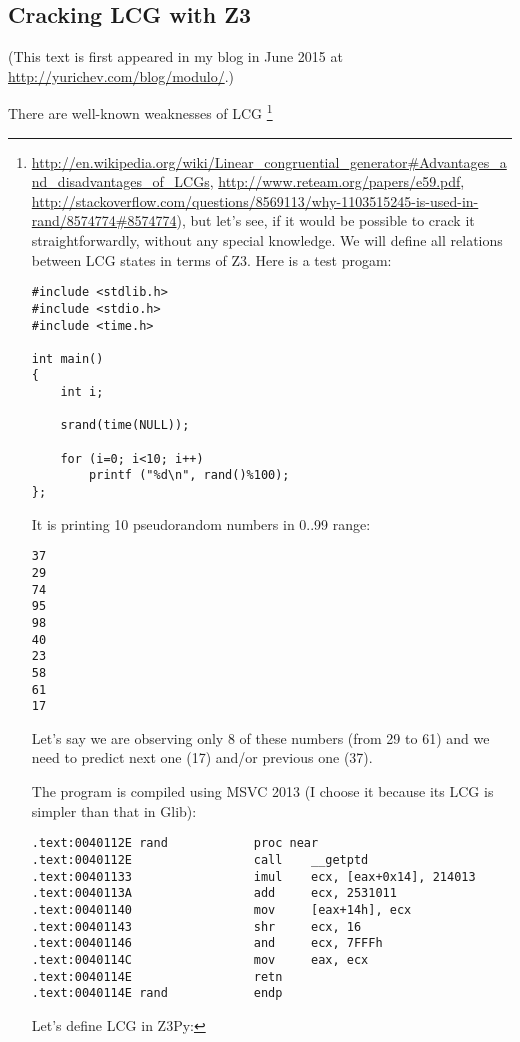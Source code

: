 \subsection{Cracking \ac{LCG} with Z3}

(This text is first appeared in my blog in June 2015 at \url{http://yurichev.com/blog/modulo/}.)

There are well-known weaknesses of \ac{LCG}
\footnote{\url{http://en.wikipedia.org/wiki/Linear_congruential_generator#Advantages_and_disadvantages_of_LCGs},
\url{http://www.reteam.org/papers/e59.pdf},
\url{http://stackoverflow.com/questions/8569113/why-1103515245-is-used-in-rand/8574774#8574774}),
but let's see, if it would be possible to crack it straightforwardly, without any special knowledge.
We will define all relations between LCG states in terms of Z3.
Here is a test progam:

\begin{lstlisting}
#include <stdlib.h>
#include <stdio.h>
#include <time.h>

int main()
{
	int i;

	srand(time(NULL));

	for (i=0; i<10; i++)
		printf ("%d\n", rand()%100);
};
\end{lstlisting}

It is printing 10 pseudorandom numbers in 0..99 range:

\begin{lstlisting}
37
29
74
95
98
40
23
58
61
17
\end{lstlisting}

Let's say we are observing only 8 of these numbers (from 29 to 61) and we need to predict next one (17) and/or previous one (37).

The program is compiled using MSVC 2013 (I choose it because its LCG is simpler than that in Glib):

\begin{lstlisting}
.text:0040112E rand            proc near
.text:0040112E                 call    __getptd
.text:00401133                 imul    ecx, [eax+0x14], 214013
.text:0040113A                 add     ecx, 2531011
.text:00401140                 mov     [eax+14h], ecx
.text:00401143                 shr     ecx, 16
.text:00401146                 and     ecx, 7FFFh
.text:0040114C                 mov     eax, ecx
.text:0040114E                 retn
.text:0040114E rand            endp
\end{lstlisting}

Let's define \ac{LCG} in Z3Py:

}
